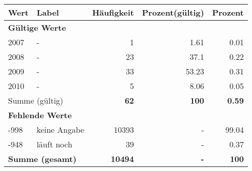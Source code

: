      \begin{longtable}{lXrrr}
     \toprule
     \textbf{Wert} & \textbf{Label} & \textbf{Häufigkeit} & \textbf{Prozent(gültig)} & \textbf{Prozent} \\
     \endhead
     \midrule
     \multicolumn{5}{l}{\textbf{Gültige Werte}}\\

     2007 &
     \multicolumn{1}{X}{ -  } &


       \num{1} &
       \num[round-mode=places,round-precision=2]{1.61} &
         \num[round-mode=places,round-precision=2]{0.01} \\

     2008 &
     \multicolumn{1}{X}{ -  } &


       \num{23} &
       \num[round-mode=places,round-precision=2]{37.1} &
         \num[round-mode=places,round-precision=2]{0.22} \\

     2009 &
     \multicolumn{1}{X}{ -  } &


       \num{33} &
       \num[round-mode=places,round-precision=2]{53.23} &
         \num[round-mode=places,round-precision=2]{0.31} \\

     2010 &
     \multicolumn{1}{X}{ -  } &


       \num{5} &
       \num[round-mode=places,round-precision=2]{8.06} &
         \num[round-mode=places,round-precision=2]{0.05} \\
     \midrule
     \multicolumn{2}{l}{Summe (gültig)} &
       \textbf{\num{62}} &
     \textbf{\num{100}} &
       \textbf{\num[round-mode=places,round-precision=2]{0.59}} \\
     \multicolumn{5}{l}{\textbf{Fehlende Werte}}\\
       -998 &
       keine Angabe &
         \num{10393} &
        - &
         \num[round-mode=places,round-precision=2]{99.04} \\
       -948 &
       läuft noch &
         \num{39} &
        - &
         \num[round-mode=places,round-precision=2]{0.37} \\
     \midrule
     \multicolumn{2}{l}{\textbf{Summe (gesamt)}} &
          \textbf{\num{10494}} &
        \textbf{-} &
        \textbf{\num{100}} \\
     \bottomrule
     \end{longtable}
     
